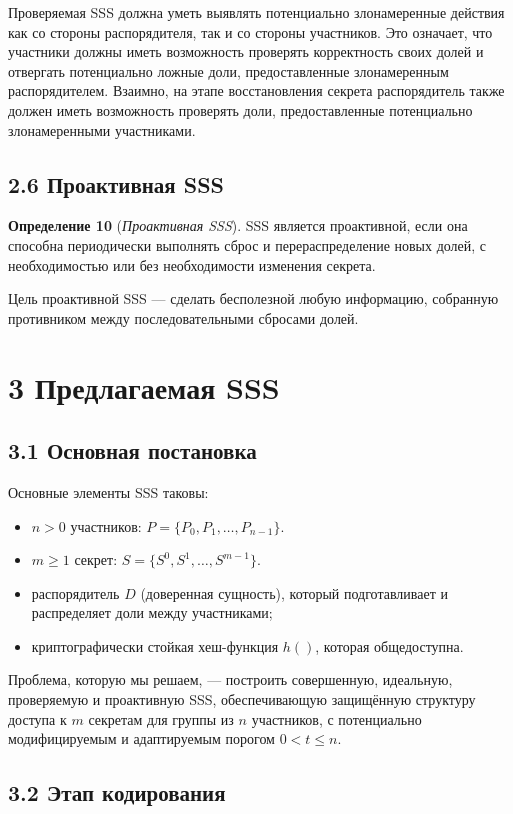 Проверяемая SSS должна уметь выявлять потенциально злонамеренные действия как со стороны распорядителя, так и со стороны участников. Это означает, что участники должны иметь возможность проверять корректность своих долей и отвергать потенциально ложные доли, предоставленные злонамеренным распорядителем. Взаимно, на этапе восстановления секрета распорядитель также должен иметь возможность проверять доли, предоставленные потенциально злонамеренными участниками.

\subsection*{2.6 \quad Проактивная SSS}

\textbf{Определение 10} (\textit{Проактивная SSS}). SSS является проактивной, если она способна периодически выполнять сброс и перераспределение новых долей, с необходимостью или без необходимости изменения секрета.

Цель проактивной SSS — сделать бесполезной любую информацию, собранную противником между последовательными сбросами долей.

\section*{3 \quad Предлагаемая SSS}

\subsection*{3.1 \quad Основная постановка}

Основные элементы SSS таковы:
\begin{itemize}
\item \(n>0\) участников: \(P=\{P_0, P_1, \ldots, P_{n-1}\}\).
\item \(m\ge 1\) секрет: \(S=\{S^0, S^1, \ldots, S^{m-1}\}\).
\item распорядитель \(D\) (доверенная сущность), который подготавливает и распределяет доли между участниками;
\item криптографически стойкая хеш-функция \(h()\), которая общедоступна.
\end{itemize}

Проблема, которую мы решаем, — построить совершенную, идеальную, проверяемую и проактивную SSS, обеспечивающую защищённую структуру доступа к \(m\) секретам для группы из \(n\) участников, с потенциально модифицируемым и адаптируемым порогом \(0<t\le n\).

\subsection*{3.2 \quad Этап кодирования}

